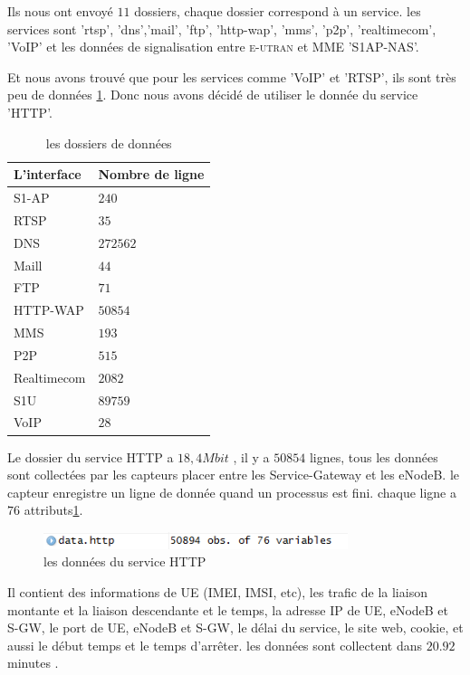 Ils nous ont envoyé $11$ dossiers, chaque dossier correspond à un service. les services sont 'rtsp', 'dns','mail', 'ftp', 'http-wap', 'mms', 'p2p', 'realtimecom', 'VoIP' et les données de signalisation entre \textsc{e-utran} et MME 'S1AP-NAS'.
    
Et nous avons trouvé que pour les services comme 'VoIP' et 'RTSP', ils sont très peu de données \ref{table.nombre}. Donc nous avons décidé de utiliser le donnée du service 'HTTP'.

\begin{table}[H]
\centering
	\begin{tabular}{|>{\centering\arraybackslash}p{4 cm}|>{\centering\arraybackslash}p{4 cm}|}
	\hline \textsf{L'interface }& \textsf{Nombre de ligne} \\ 
	\hline S1-AP & $240$ \\ 
	\hline RTSP &$ 35$ \\ 
	\hline DNS  & $272562$ \\ 
	\hline Maill & $44$ \\ 
	\hline FTP &$ 71$ \\ 
	\hline HTTP-WAP & $50854$ \\ 
	\hline MMS & $193$ \\ 
	\hline P2P & $515$ \\ 
	\hline Realtimecom & $2082$ \\ 
	\hline S1U &$ 89759$ \\ 
	\hline VoIP & $28$ \\ 
	\hline 
	\end{tabular} 
	\caption{les dossiers de données}
	          \label{table.nombre}
\end{table}


Le dossier du service HTTP a $18,4Mbit$ , il y a $50854$ lignes, tous les données sont collectées par les capteurs placer entre les Service-Gateway et les eNodeB. le capteur enregistre un ligne de donnée quand un processus est fini. chaque ligne a $76$ attributs\ref{Fig.HTTP}.

      \begin{figure}[H]
          \centering
          \includegraphics[width=3.5in]{images/http.png}
          \caption{les données du service HTTP}
          \label{Fig.HTTP}
      \end{figure}
      
Il contient des informations de UE (IMEI, IMSI, etc), les trafic de la liaison montante et la liaison descendante et le temps, la adresse IP de UE, eNodeB et S-GW, le port de UE, eNodeB et S-GW, le délai du service, le site web, cookie, et aussi le début temps et le temps d'arrêter.
les données sont collectent dans $20.92$ minutes .

